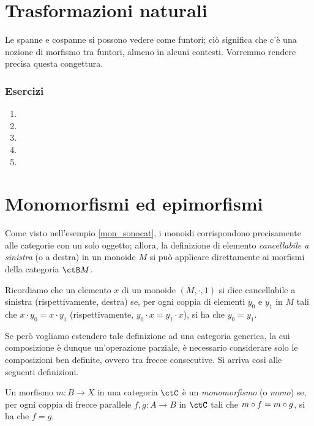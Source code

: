 \section{Trasformazioni naturali}\label{sec_tnat}
Le spanne e cospanne si possono vedere come funtori; ciò significa che c'è una nozione di morfismo tra funtori, almeno in alcuni contesti. Vorremmo rendere precisa questa congettura.
\subsubsection*{Esercizi}
\begin{enumerate}
	\item
	\item
	\item
	\item
	\item
\end{enumerate}
\section{Monomorfismi ed epimorfismi}\label{sec_monoepi}

Come visto nell'esempio \ref{mon_sonocat}, i monoidi corrispondono precisamente alle categorie con un solo oggetto; allora,
la definizione di elemento \emph{cancellabile a sinistra} (o a destra) in un monoide \(M\) si può applicare direttamente ai morfismi della categoria \(\ctB M\).

Ricordiamo che un elemento \(x\) di un monoide \((M, \cdot, 1)\) si dice cancellabile a sinistra (rispettivamente, destra) se,
per ogni coppia di elementi \(y_0\) e \(y_1\) in \(M\) tali che \(x \cdot y_0 = x \cdot y_1\) (rispettivamente, \(y_0 \cdot x = y_1 \cdot x\)), si ha che \(y_0 = y_1\).

Se però vogliamo estendere tale definizione ad una categoria generica,
la cui composizione è dunque un'operazione parziale,
è necessario considerare solo le composizioni ben definite, ovvero tra frecce consecutive.
Si arriva così alle seguenti definizioni.

\begin{definition}[Monomorfismo]\label{def_Mono}
	Un morfismo \(m \colon B \to X\) in una categoria \(\ctC\) è un \emph{monomorfismo} (o \emph{mono}) se,
	per ogni coppia di frecce parallele \(f, g \colon A \to B\) in \(\ctC\) tali che \(m \circ f = m \circ g\), si ha che \(f = g\).
\end{definition}


